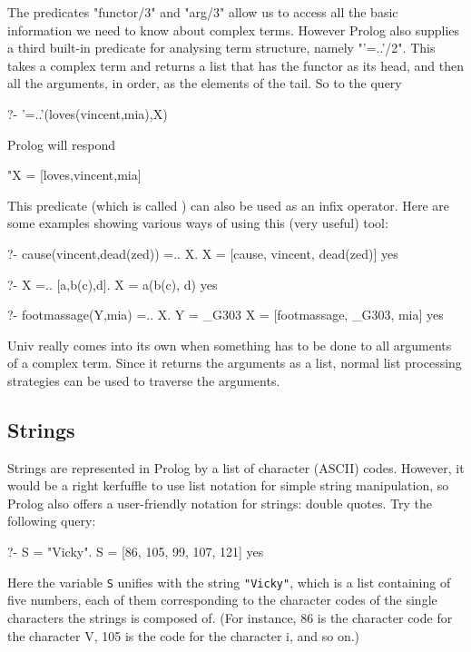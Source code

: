 The predicates "functor/3" and "arg/3" allow us to access all the
basic information we need to know about complex terms. However Prolog
also supplies a third built-in predicate for analysing term structure,
namely "'=..'/2". This takes a complex term and returns a list that
has the functor as its head, and then all the arguments, in order, as
the elements of the tail.  So to the query
\begin{LPNcodedisplay}
?- '=..'(loves(vincent,mia),X)
\end{LPNcodedisplay}
Prolog will respond
\begin{LPNcodedisplay}
"X = [loves,vincent,mia]
\end{LPNcodedisplay}
This predicate (which is called ) can also be used as an
infix operator. Here are some examples showing various ways of
using this (very useful) tool:
\begin{LPNcodedisplay}
?- cause(vincent,dead(zed)) =.. X.
X = [cause, vincent, dead(zed)]
yes

?- X =.. [a,b(c),d].
X = a(b(c), d)
yes

?- footmassage(Y,mia) =.. X.
Y = _G303
X = [footmassage, _G303, mia]
yes
\end{LPNcodedisplay}

Univ really comes into its own when something has to be done to all
arguments of a complex term. Since it returns the arguments as a list,
normal list processing strategies can be used to traverse the
arguments.


\subsection*{Strings}\label{SUBSEC.L9.STRINGS}

Strings are represented in Prolog by a list of character (ASCII)
codes. However, it would be a right kerfuffle to use list notation for
simple string manipulation, so Prolog also offers a user-friendly
notation for strings: double quotes. Try the following query:

\begin{LPNcodedisplay}
?- S = "Vicky".
S = [86, 105, 99, 107, 121]
yes
\end{LPNcodedisplay}
Here the variable \texttt{S} unifies with the string \texttt{"Vicky"},
which is a list containing of five numbers, each of them corresponding
to the character codes of the single characters the strings is
composed of.  (For instance, 86 is the character code for the
character V, 105 is the code for the character i, and so on.)

